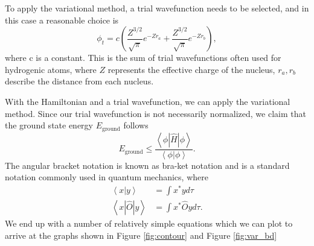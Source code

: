 \documentclass[journal=jacsat,manuscript=communication]{achemso}
\begin{document}
To apply the variational method, a trial wavefunction needs to be selected, and in this case a reasonable choice is
\begin{equation}
	\phi_t = c\left(\frac{Z^{3/2}}{\sqrt{\pi}}e^{-Zr_a} + \frac{Z^{3/2}}{\sqrt{\pi}}e^{-Zr_b}\right),
\end{equation}
where c is a constant.  This is the sum of trial wavefunctions often used for hydrogenic atoms, where $Z$ represents the effective charge of the nucleus, $r_a,r_b$ describe the distance from each nucleus.
  
With the Hamiltonian and a trial wavefunction, we can apply the variational method.  Since our trial wavefunction is not necessarily normalized, we claim that the ground state energy $E_\textrm{ground}$ follows
\begin{equation}
E_\textrm{ground} \leq \frac{\left<\phi | \hat{H} | \phi \right>}{\left<\phi|\phi\right>}.
\end{equation} 
The angular bracket notation is known as bra-ket notation and is a standard notation commonly used in quantum mechanics, where
\begin{align}
	\left<x|y\right> &= \int x^* y d\tau \\
	\left<x|\hat{O}|y\right> &= \int x^* \hat{O}yd\tau.
\end{align}
We end up with a number of relatively simple equations which we can plot to arrive at the graphs shown in Figure \ref{fig:contour} and Figure \ref{fig:var_bd}
\end{document}
